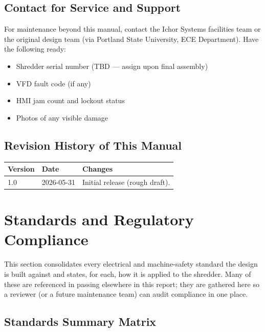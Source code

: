 \documentclass[hidelinks,12pt]{article}
\begin{document}
\subsection{Contact for Service and Support}
For maintenance beyond this manual, contact the Ichor Systems facilities team or the original design team (via Portland State University, ECE Department). Have the following ready:
\begin{itemize}
    \item Shredder serial number (TBD — assign upon final assembly)
    \item VFD fault code (if any)
    \item HMI jam count and lockout status
    \item Photos of any visible damage
\end{itemize}

\subsection{Revision History of This Manual}
\begin{table}[H]
\centering
\begin{tabularx}{0.7\textwidth}{|l|l|X|}
\hline
\rowcolor{PSUgreen!12}\textbf{Version} & \textbf{Date} & \textbf{Changes} \\
\hline
1.0 & 2026-05-31 & Initial release (rough draft). \\
\hline
\end{tabularx}
\end{table}

\section{Standards and Regulatory Compliance}

This section consolidates every electrical and machine-safety standard the design
is built against and states, for each, how it is applied to the shredder. Many of
these are referenced in passing elsewhere in this report; they are gathered here so
a reviewer (or a future maintenance team) can audit compliance in one place.

\subsection{Standards Summary Matrix}
\end{document}
